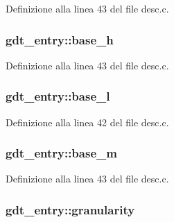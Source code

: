 Definizione alla linea 43 del file desc.\+c.

\hypertarget{structgdt__entry_af64e5321b471da1d5ddf85ff9b0a19d3}{
\subsubsection[{base\+\_\+h}]{ gdt\+\_\+entry\+::base\+\_\+h}}\label{structgdt__entry_af64e5321b471da1d5ddf85ff9b0a19d3}


Definizione alla linea 43 del file desc.\+c.

\hypertarget{structgdt__entry_ae9d195807cdaf9fdfa4d28522b4e6ea6}{
\subsubsection[{base\+\_\+l}]{ gdt\+\_\+entry\+::base\+\_\+l}}\label{structgdt__entry_ae9d195807cdaf9fdfa4d28522b4e6ea6}


Definizione alla linea 42 del file desc.\+c.

\hypertarget{structgdt__entry_a9866fb96bce8b51042b75995a9f5ed4f}{
\subsubsection[{base\+\_\+m}]{ gdt\+\_\+entry\+::base\+\_\+m}}\label{structgdt__entry_a9866fb96bce8b51042b75995a9f5ed4f}


Definizione alla linea 43 del file desc.\+c.

\hypertarget{structgdt__entry_accb2a2ef318b0e4fbe2016eb8097947d}{
\subsubsection[{granularity}]{ gdt\+\_\+entry\+::granularity}}\label{structgdt__entry_accb2a2ef318b0e4fbe2016eb8097947d}


